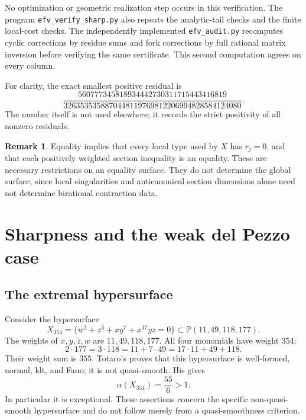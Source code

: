 \documentclass[12pt,a4paper]{article}
\numberwithin{equation}{section}
\theoremstyle{definition}
\newtheorem{remark}[theorem]{Remark}
\newcommand{\PP}{\mathbb P}
\begin{document}
No optimization or geometric realization step occurs in this
verification. The program \texttt{efv\_verify\_sharp.py} also repeats
the analytic-tail checks and the finite local-cost checks.
The independently implemented \texttt{efv\_audit.py} recomputes
cyclic corrections by residue sums and fork corrections by full
rational matrix inversion before verifying the same certificate.
This second computation agrees on every column.

For clarity, the exact smallest positive residual is
\[
 \frac{560777345818934442730311715443416819}
      {3263535358870448119769812206994828584124080}.
\]
The number itself is not used elsewhere; it records the strict
positivity of all nonzero residuals.

\begin{remark}\label{rem:equality}
Equality implies that every local type used by \(X\) has \(r_j=0\),
and that each positively weighted section inequality is an equality.
These are necessary restrictions on an equality surface.
They do not determine the global surface, since local singularities
and anticanonical section dimensions alone need not determine
birational contraction data.
\end{remark}

\section{Sharpness and the weak del Pezzo case}\label{sec:conclusion}

\subsection{The extremal hypersurface}

Consider the hypersurface
\begin{equation}\label{eq:Totaro}
       X_{354}=\{w^2+z^3+xy^7+x^{17}yz=0\}
                         \subset\PP(11,49,118,177).
\end{equation}
The weights of \(x,y,z,w\) are \(11,49,118,177\).
All four monomials have weight \(354\):
\[
 2\cdot177=3\cdot118=11+7\cdot49=17\cdot11+49+118.
\]
Their weight sum is \(355\). Totaro's
\cite[Theorem 3.1]{Tot24} proves that this hypersurface is well-formed,
normal, klt, and Fano; it is not quasi-smooth.
His \cite[Theorem 6.1]{Tot24} gives
\[
                            \alpha(X_{354})=\frac{55}{6}>1.
\]
In particular it is exceptional. These assertions concern the
specific non-quasi-smooth hypersurface and do not follow merely
from a quasi-smoothness criterion.
\end{document}
